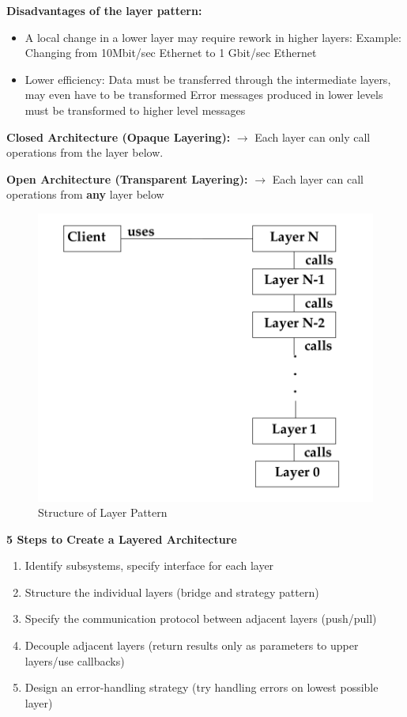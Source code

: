 \textbf{Disadvantages of the layer pattern:}
\begin{itemize}[topsep=5pt, itemsep=0pt]
	\item A local change in a lower layer may require rework in higher layers:
	\subitem Example: Changing from 10Mbit/sec Ethernet to 1 Gbit/sec Ethernet
	\item Lower efficiency:
		\subitem Data must be transferred through the intermediate layers, may even have to be
	 transformed
		\subitem Error messages produced in lower levels must be transformed to higher level messages
\end{itemize}

\begin{description}
	\item \textbf{Closed Architecture (Opaque Layering):}
		\subitem $\rightarrow$ Each layer can only call operations from the layer below.
	\item \textbf{Open Architecture (Transparent Layering):}
		\subitem $\rightarrow$ Each layer can call operations from \textbf{any} layer below
\end{description}
\newpage

\begin{figure}[h]
	\centering
	\includegraphics[width=0.6\linewidth]{images/pattern_layer.png}
	\caption{Structure of Layer Pattern}
\end{figure}

\textbf{5 Steps to Create a Layered Architecture}
\begin{enumerate}
  \item Identify subsystems, specify interface for each layer
  \item Structure the individual layers (bridge and strategy pattern)
  \item Specify the communication protocol between adjacent layers (push/pull)
  \item Decouple adjacent layers (return results only as parameters to upper layers/use callbacks)
  \item Design an error-handling strategy (try handling errors on lowest possible layer)
\end{enumerate}
\newpage


